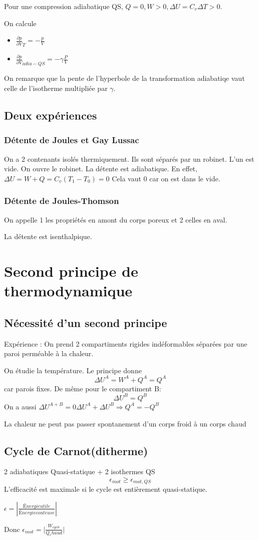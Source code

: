 \documentclass[french]{yLectureNote}
\begin{document}
Pour une compression adiabatique QS, $Q=0, W>0, \Delta U = C_v \Delta T >0$.

On calcule 
\begin{itemize}
    \item $\frac{\partial p}{\partial V}_T = -\frac{p}{V}$
    \item $\frac{\partial p}{\partial V}_{adia-QS} = - \gamma \frac{P}{V}$
\end{itemize}
On remarque que la pente de l'hyperbole de la transformation adiabatiqe vaut celle de l'isotherme multipliée par $\gamma$.
\section{Deux expériences}
\subsection{Détente de Joules et Gay Lussac}
On a 2 contenants isolés thermiquement. Ils sont séparés par un robinet. L'un est vide.
On ouvre le robinet.
La détente est adiabatique. En effet, $\Delta U = W + Q = C_v(T_1-T_0) = 0$
Cela vaut 0 car on est dans le vide.
\subsection{Détente de Joules-Thomson}
On appelle 1 les propriétés en amont du corps poreux et 2 celles en aval.

La détente est isenthalpique.
\chapter{Second principe de thermodynamique}
\section{Nécessité d'un second principe}
Expérience : On prend 2 compartiments rigides indéformables séparées par une paroi perméable à la chaleur.

On étudie la température. Le principe donne 
$$\Delta U^A = W^A+Q^A = Q^A$$ car parois fixes. De même pour le compartiment B:
$$\Delta U^B = Q^B$$
On a aussi $\Delta U^{A+B}=0 \Delta U^A+\Delta U^B \Rightarrow Q^A = -Q^B$
\begin{theorem}
    La chaleur ne peut pas passer spontanement d'un corps froid à un corps chaud
\end{theorem}
\section{Cycle de Carnot(ditherme)}
2 adiabatiques Quasi-statique + 2 isothermes QS
$$\epsilon_{mot} \geq \epsilon_{mot, QS}$$L'efficacité est maximale si le cycle est entièrement quasi-statique.
\begin{definition}[Efficacité]
    $\epsilon = |\frac{Énergie utile}{Énergie couteuse}|$
\end{definition}
Donc $\epsilon_{mot} = \Big|\frac{W_{cycle}}{Q_chaud}\Big|$
\end{document}
